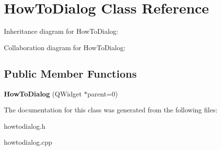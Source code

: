 \hypertarget{class_how_to_dialog}{\section{How\+To\+Dialog Class Reference}
\label{class_how_to_dialog}
}


Inheritance diagram for How\+To\+Dialog\+:


Collaboration diagram for How\+To\+Dialog\+:
\subsection*{Public Member Functions}
\begin{DoxyCompactItemize}
\item 
\hypertarget{class_how_to_dialog_ae1cee44a39ca4f51994de2e4067e6121}{{\bfseries How\+To\+Dialog} (Q\+Widget $\ast$parent=0)}\label{class_how_to_dialog_ae1cee44a39ca4f51994de2e4067e6121}

\end{DoxyCompactItemize}


The documentation for this class was generated from the following files\+:\begin{DoxyCompactItemize}
\item 
howtodialog.\+h\item 
howtodialog.\+cpp\end{DoxyCompactItemize}
